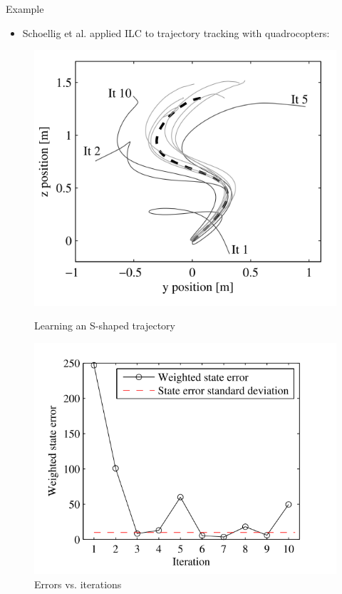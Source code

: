 \documentclass[handout]{beamer}
\begin{document}
\begin{frame}{Example}
\begin{itemize}
\item Schoellig et al. \cite{ILC_Angela} applied ILC to trajectory tracking with quadrocopters: \pause
\end{itemize}
\begin{figure}[!htb]
  \includegraphics[width=\linewidth]{ilc.png}
  \caption{Learning an S-shaped trajectory}
\endminipage\hfill
{}
  \includegraphics[width=\linewidth]{ilc_error.png}
  \caption{Errors vs. iterations}
\endminipage
\end{figure}
\end{frame}
\end{document}

